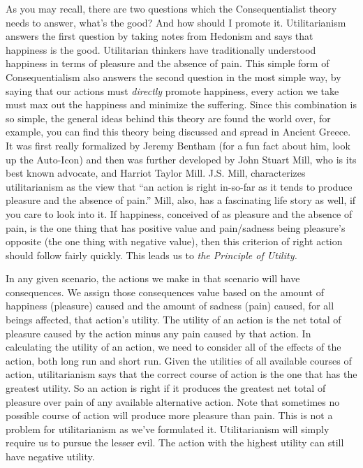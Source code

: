 As you may recall, there are two questions which the Consequentialist theory needs to answer, what's the good? And how should I promote it. Utilitarianism answers the first question by taking notes from Hedonism and says that happiness is the good. Utilitarian thinkers have traditionally understood happiness in terms of pleasure and the absence of pain. This simple form of Consequentialism also answers the second question in the most simple way, by saying that our actions must \emph{directly} promote happiness, every action we take must max out the happiness and minimize the suffering. Since this combination is so simple,  the general ideas behind this theory are found the world over, for example, you can find this theory being discussed and spread in Ancient Greece. It was first really formalized by Jeremy Bentham (for a fun fact about him, look up the Auto-Icon) and then was further developed by John Stuart Mill, who is its best known advocate, and Harriot Taylor Mill.\autocite{Driver3} J.S. Mill, characterizes utilitarianism as the view that “an action is right in-so-far as it tends to produce pleasure and the absence of pain.” Mill, also, has a fascinating life story as well, if you care to look into it.  If happiness, conceived of as pleasure and the absence of pain, is the one thing that has positive value and pain/sadness being pleasure's opposite (the one thing with negative value), then this criterion of right action should follow fairly quickly. This leads us to \emph{the Principle of Utility.}

In any given scenario, the actions we make in that scenario will have consequences. We assign those consequences value based on the amount of happiness (pleasure) caused and the amount of sadness (pain) caused, for all beings affected, that action's utility. The utility of an action is the net total of pleasure caused by the action minus any pain caused by that action. In calculating the utility of an action, we need to consider all of the effects of the action, both long run and short run. Given the utilities of all available courses of action, utilitarianism says that the correct course of action is the one that has the greatest utility. So an action is right if it produces the greatest net total of pleasure over pain of any available alternative action. Note that sometimes no possible course of action will produce more pleasure than pain. This is not a problem for utilitarianism as we’ve formulated it. Utilitarianism will simply require us to pursue the lesser evil. The action with the highest utility can still have negative utility.

